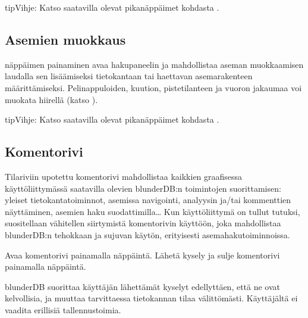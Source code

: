 \documentclass[letterpaper,10pt,finnish]{sphinxmanual}
\begin{document}
\begin{sphinxadmonition}{tip}{Vihje:}
\sphinxAtStartPar
Katso saatavilla olevat pikanäppäimet kohdasta {\hyperref[\detokenize{raccourcis:raccourcis}]{}}.
\end{sphinxadmonition}


\subsection{Asemien muokkaus}
\label{\detokenize{manuel:edition-de-positions}}\label{\detokenize{manuel:edition-positions}}
\sphinxAtStartPar
{}\sphinxhyphen{}näppäimen painaminen avaa hakupaneelin ja mahdollistaa aseman muokkaamisen laudalla sen lisäämiseksi tietokantaan tai haettavan asemarakenteen määrittämiseksi. Pelinappuloiden, kuution, pistetilanteen ja vuoron jakaumaa voi muokata hiirellä (katso {\hyperref[\detokenize{guide_utilisateur:guide-edit-position}]{}}).

\begin{sphinxadmonition}{tip}{Vihje:}
\sphinxAtStartPar
Katso saatavilla olevat pikanäppäimet kohdasta {\hyperref[\detokenize{raccourcis:raccourcis}]{}}.
\end{sphinxadmonition}


\subsection{Komentorivi}
\label{\detokenize{manuel:la-ligne-de-commande}}\label{\detokenize{manuel:ligne-commande}}
\sphinxAtStartPar
Tilariviin upotettu komentorivi mahdollistaa kaikkien graafisessa käyttöliittymässä saatavilla olevien blunderDB:n toimintojen suorittamisen: yleiset tietokantatoiminnot, asemissa navigointi, analyysin ja/tai kommenttien näyttäminen, asemien haku suodattimilla… Kun käyttöliittymä on tullut tutuksi, suositellaan vähitellen siirtymistä komentorivin käyttöön, joka mahdollistaa blunderDB:n tehokkaan ja sujuvan käytön, erityisesti asemahakutoiminnoissa.

\sphinxAtStartPar
Avaa komentorivi painamalla \sphinxhyphen{}näppäintä. Lähetä kysely ja sulje komentorivi painamalla \sphinxhyphen{}näppäintä.

\sphinxAtStartPar
blunderDB suorittaa käyttäjän lähettämät kyselyt edellyttäen, että ne ovat kelvollisia, ja muuttaa tarvittaessa tietokannan tilaa välittömästi. Käyttäjältä ei vaadita erillisiä tallennustoimia.
\end{document}

